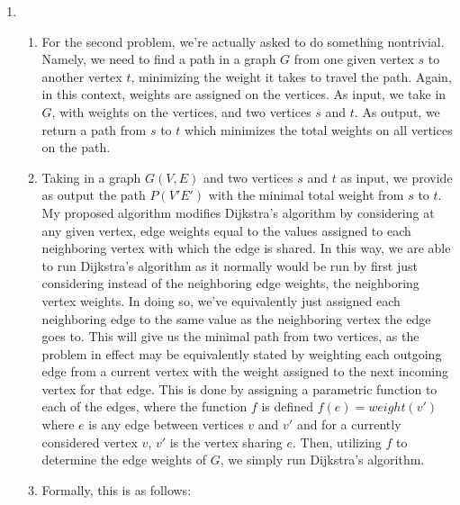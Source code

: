 \documentclass{article}
\begin{document}
\begin{enumerate}
	\item \begin{enumerate}
			\item For the second problem, we're actually asked to do something nontrivial. Namely, we need to find a path
				in a graph $G$ from one given vertex $s$ to another vertex $t$, minimizing the weight it takes to travel
				the path. Again, in this context, weights are assigned on the vertices. As input, we take in $G$, with
				weights on the vertices, and two vertices $s$ and $t$. As output, we return a path from $s$ to $t$ which
				minimizes the total weights on all vertices on the path. 
			\item Taking in a graph $G(V,E)$ and two vertices $s$ and $t$ as input, we provide as output the path $P(V'E')$ 
				with the minimal total weight from $s$ to $t$. My proposed algorithm modifies Dijkstra's algorithm 
				by considering at any given vertex, edge weights equal
				to the values assigned to each neighboring vertex with which the edge is shared. In this way, we are able to
				run Dijkstra's algorithm as it normally would be run by first just considering instead of the neighboring
				edge weights, the neighboring vertex weights. In doing so, we've equivalently just assigned each neighboring
				edge to the same value as the neighboring vertex the edge goes to. This will give us the minimal path from
				two vertices, as the problem in effect may be equivalently stated by weighting each outgoing edge from a
				current vertex with the weight assigned to the next incoming vertex for that edge. This is done by assigning
				a parametric function to each of the edges, where the function $f$ is defined 
				$f(e) = weight(v')$ where $e$ is any edge between vertices $v$ and $v'$ and for a currently 
				considered vertex $v$, $v'$ is the vertex sharing $e$. Then, utilizing $f$ to determine the edge weights of 
				$G$, we simply run Dijkstra's algorithm.
			\item Formally, this is as follows:


\end{enumerate}
\end{enumerate}
\end{document}
